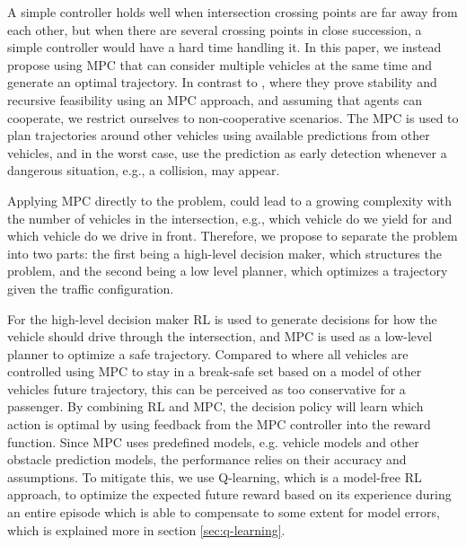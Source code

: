 A simple controller holds well when intersection crossing points are far away from each other, but when there are several crossing points in close succession, a simple controller would have a hard time handling it. In this paper, we instead propose using MPC that can consider multiple vehicles at the same time and generate an optimal trajectory. In contrast to \cite{hult}, where they prove stability and recursive feasibility using an MPC approach, and assuming that agents can cooperate, we restrict ourselves to non-cooperative scenarios. 
The MPC is used to plan trajectories around other vehicles using available predictions from other vehicles, and in the worst case, use the prediction as early detection whenever a dangerous situation, e.g., a collision, may appear. 

Applying MPC directly to the problem, could lead to a growing complexity with the number of vehicles in the intersection, e.g., which vehicle do we yield for and which vehicle do we drive in front. Therefore, we propose to separate the problem into two parts: the first being a high-level decision maker, which structures the problem, and the second being a low level planner, which optimizes a trajectory given the traffic configuration. 

For the high-level decision maker RL is used to generate decisions for how the vehicle should drive through the intersection, and MPC is used as a low-level planner to optimize a safe trajectory. Compared to \cite{decentralizedMPC} where all vehicles are controlled using MPC to stay in a break-safe set based on a model of other vehicles future trajectory, this can be perceived as too conservative for a passenger. By combining RL and MPC, the decision policy will learn which action is optimal by using feedback from the MPC controller into the reward function. Since MPC uses predefined models, e.g. vehicle models and other obstacle prediction models, the performance relies on their accuracy and assumptions. To mitigate this, we use Q-learning, which is a model-free RL approach, to optimize the expected future reward based on its experience during an entire episode which is able to compensate to some extent for model errors, which is explained more in section \ref{sec:q-learning}. 


